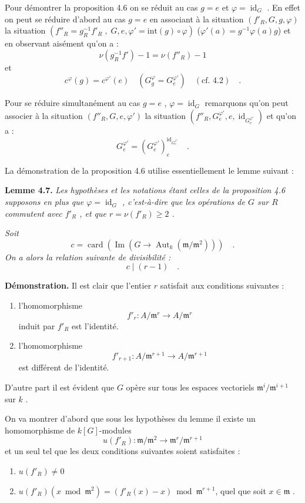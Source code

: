\documentclass[11pt]{article}
\providecommand{\fm}{\mathfrak{m}}
\providecommand{\id}{\operatorname{id}}
\providecommand{\id}{\operatorname{id}}
\providecommand{\id}{\operatorname{id}}
\providecommand{\Aut}{\operatorname{Aut}}
\providecommand{\id}{\operatorname{id}}
\providecommand{\id}{\operatorname{id}}
\providecommand{\im}{\operatorname{Im}}
\providecommand{\fm}{\mathfrak m}
\providecommand{\card}{\operatorname{card}}
\providecommand{\im}{\operatorname{im}}
\providecommand{\Aut}{\operatorname{Aut}}
\providecommand{\id}{\operatorname{id}}
\begin{document}
\medskip

Pour démontrer la proposition 4.6 on se réduit au cas $g = e$ et $\varphi = \id_G$ . En effet on peut se réduire d'abord au cas $g = e$ en associant à la situation $(f'_R, G, g, \varphi)$ la situation $(f''_R = g_R^{-1}f'_R \; , \; G, e, \varphi' = \mathrm{int}(g) \circ \varphi)$ ($\varphi'(a) = g^{-1}\varphi(a)g$) et en observant aisément qu'on a :
\[
\nu(g_R^{-1}f') - 1 = \nu(f''_R) - 1
\]
et
\[
c^\varphi(g) = c^{\varphi'}(e) \quad (G_g^\varphi = G_e^{\varphi'}) \quad (\text{cf. 4.2}) \quad .
\]

Pour se réduire simultanément au cas $g = e$ , $\varphi = \id_G$ remarquons qu'on peut associer à la situation $(f''_R, G, e, \varphi')$ la situation $(f''_R, G_e^{\varphi'}, e, \id_{G_e^{\varphi'}})$ et qu'on a :
\[
G_e^{\varphi'} = (G_e^{\varphi'})_e^{\id_{G_e^{\varphi'}}} \quad .
\]

La démonstration de la proposition 4.6 utilise essentiellement le lemme suivant :

\medskip
\noindent
\textbf{Lemme 4.7.} \emph{Les hypothèses et les notations étant celles de la proposition 4.6 supposons en plus que $\varphi = \id_G$ , c'est-à-dire que les opérations de $G$ sur $R$ commutent avec $f'_R$ , et que $r = \nu(f'_R) \geq 2$ .}

\emph{Soit
\[
c = \card(\im(G \longrightarrow \Aut_k(\fm/\fm^2))) \quad .
\]
On a alors la relation suivante de divisibilité :
\[
c \mid (r - 1) \quad .
\]}

\medskip

\noindent
\textbf{Démonstration.} Il est clair que l'entier $r$ satisfait aux conditions suivantes :
\begin{enumerate}
\item[a)] l'homomorphisme
\[
f'_r : A/\fm^r \longrightarrow A/\fm^r
\]
induit par $f'_R$ est l'identité.
\item[b)] l'homomorphisme
\[
f'_{r+1} : A/\fm^{r+1} \longrightarrow A/\fm^{r+1}
\]
est différent de l'identité.
\end{enumerate}

D'autre part il est évident que $G$ opère sur tous les espaces vectoriels $\fm^i/\fm^{i+1}$ sur $k$ .

On va montrer d'abord que sous les hypothèses du lemme il existe un homomorphisme de $k[G]$-modules
\[
u(f'_R) : \fm/\fm^2 \longrightarrow \fm^r/\fm^{r+1}
\]
et un seul tel que les deux conditions suivantes soient satisfaites :
\begin{enumerate}
\item[1)] $u(f'_R) \neq 0$
\item[2)] $u(f'_R)(x \bmod \fm^2) = (f'_R(x) - x) \bmod \fm^{r+1}$, quel que soit $x \in \fm$ .
\end{enumerate}
\end{document}
